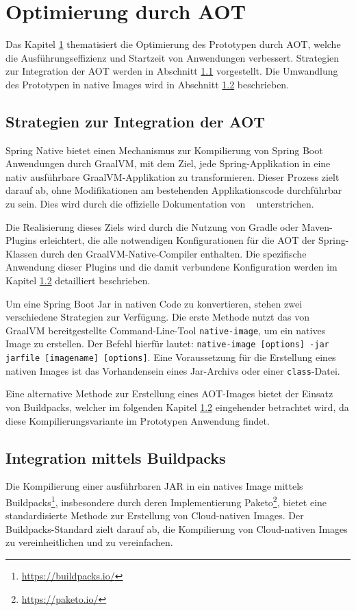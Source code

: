 \section{Optimierung durch \acl{AOT}} \label{sec:aotoptimizing}
Das Kapitel \ref{sec:aotoptimizing} thematisiert die Optimierung des Prototypen durch \acl{AOT}, welche die Ausführungseffizienz und Startzeit von Anwendungen verbessert. Strategien zur Integration der \acl{AOT} werden in Abschnitt \ref{subsec:trasformationtoaot} vorgestellt. Die Umwandlung des Prototypen in native Images wird in Abschnitt \ref{subsec:integrationaot} beschrieben.
\subsection{Strategien zur Integration der \acl{AOT}} \label{subsec:trasformationtoaot}
Spring Native bietet einen Mechanismus zur Kompilierung von Spring Boot Anwendungen durch GraalVM, mit dem Ziel, jede Spring-Applikation in eine nativ ausführbare GraalVM-Applikation zu transformieren. Dieser Prozess zielt darauf ab, ohne Modifikationen am bestehenden Applikationscode durchführbar zu sein. Dies wird durch die offizielle Dokumentation von \citeauthor{springnative}~\parencite[vgl.][]{springnative}{} unterstrichen.

Die Realisierung dieses Ziels wird durch die Nutzung von Gradle oder Maven-Plugins erleichtert, die alle notwendigen Konfigurationen für die \ac{AOT} der Spring-Klassen durch den GraalVM-Native-Compiler enthalten. Die spezifische Anwendung dieser Plugins und die damit verbundene Konfiguration werden im Kapitel \ref{subsec:integrationaot} detailliert beschrieben.

Um eine Spring Boot Jar in nativen Code zu konvertieren, stehen zwei verschiedene Strategien zur Verfügung. Die erste Methode nutzt das von GraalVM bereitgestellte Command-Line-Tool \lstinline{native-image}, um ein natives Image zu erstellen. Der Befehl hierfür lautet: \lstinline{native-image [options] -jar jarfile [imagename] [options]}. Eine Voraussetzung für die Erstellung eines nativen Images ist das Vorhandensein eines Jar-Archivs oder einer \lstinline{class}-Datei.

Eine alternative Methode zur Erstellung eines \ac{AOT}-Images bietet der Einsatz von Buildpacks, welcher im folgenden Kapitel \ref{subsec:integrationaot} eingehender betrachtet wird, da diese Kompilierungsvariante im Prototypen Anwendung findet.

\subsection{Integration mittels Buildpacks} \label{subsec:integrationaot}
Die Kompilierung einer ausführbaren JAR in ein natives Image mittels Buildpacks\footnote{\url{https://buildpacks.io/}}, insbesondere durch deren Implementierung Paketo\footnote{\url{https://paketo.io/}}, bietet eine standardisierte Methode zur Erstellung von Cloud-nativen Images. Der Buildpacks-Standard zielt darauf ab, die Kompilierung von Cloud-nativen Images zu vereinheitlichen und zu vereinfachen.

